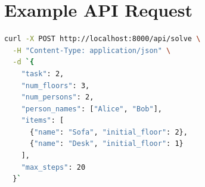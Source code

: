 \section{Example API Request} \label{sec:example-api-request}

\begin{lstlisting}[language=bash,label={lst:example-api-request}]
curl -X POST http://localhost:8000/api/solve \
  -H "Content-Type: application/json" \
  -d `{
    "task": 2,
    "num_floors": 3,
    "num_persons": 2,
    "person_names": ["Alice", "Bob"],
    "items": [
      {"name": "Sofa", "initial_floor": 2},
      {"name": "Desk", "initial_floor": 1}
    ],
    "max_steps": 20
  }`
\end{lstlisting}